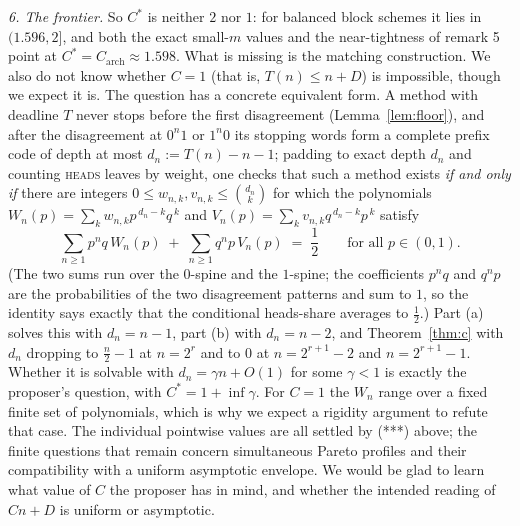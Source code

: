 \documentclass[11pt]{article}
\theoremstyle{remark}
\newcommand{\head}{\textnormal{\textsc{heads}}}
\begin{document}
\emph{6. The frontier.}
So $C^{*}$ is neither $2$ nor $1$: for balanced block schemes it lies in
$(1.596,2]$, and both the exact small-$m$ values and the near-tightness of
remark 5 point at $C^{*}=C_{\mathrm{arch}}\approx1.598$. What is missing is
the matching construction. We also
do not know whether $C=1$ (that is, $T(n)\le n+D$) is impossible, though we
expect it is. The question has a
concrete equivalent form. A method with deadline $T$ never stops before the
first disagreement (Lemma~\ref{lem:floor}), and after the disagreement at
$0^{n}1$ or $1^{n}0$ its stopping words form a complete prefix code of depth
at most $d_n:=T(n)-n-1$; padding to exact depth $d_n$ and counting \head{}
leaves by weight, one checks that such a method exists \emph{if and only if}
there are integers $0\le w_{n,k},v_{n,k}\le\binom{d_n}k$ for which the
polynomials $W_n(p)=\sum_{k}w_{n,k}p^{\,d_n-k}q^{\,k}$ and
$V_n(p)=\sum_{k}v_{n,k}q^{\,d_n-k}p^{\,k}$ satisfy
\[
\sum_{n\ge1}p^{n}q\,W_n(p)\;+\;\sum_{n\ge1}q^{n}p\,V_n(p)\;=\;\frac12
\qquad\text{for all } p\in(0,1).
\]
(The two sums run over the $0$-spine and the $1$-spine; the coefficients
$p^nq$ and $q^np$ are the probabilities of the two disagreement patterns and
sum to $1$, so the identity says exactly that the conditional heads-share
averages to $\tfrac12$.) Part (a) solves this with $d_n=n-1$, part (b) with
$d_n=n-2$, and Theorem~\ref{thm:c} with $d_n$ dropping to $\tfrac n2-1$ at
$n=2^r$ and to $0$ at $n=2^{r+1}-2$ and $n=2^{r+1}-1$. Whether it is solvable
with $d_n=\gamma n+O(1)$ for some $\gamma<1$ is exactly the proposer's
question, with $C^{*}=1+\inf\gamma$. For $C=1$ the $W_n$ range over a fixed finite set
of polynomials, which is why we expect a rigidity argument to refute that
case.  The individual pointwise values are all settled by (***) above; the
finite questions that remain concern simultaneous Pareto profiles and their
compatibility with a uniform asymptotic envelope. We would be glad to
learn what value of $C$ the proposer has in mind, and whether the intended
reading of $Cn+D$ is uniform or asymptotic.
\end{document}
